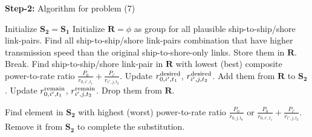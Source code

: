 \documentclass[conference]{IEEEtran}
\begin{document}
 
 \begin{algorithm}[ht]
 \caption{\textbf{Step-2:} Algorithm for problem (7)}
 \begin{algorithmic}[1]
 \STATE Initialize ${{\mathbf{S}}_{\mathbf{2}}}={{\mathbf{S}}_{\mathbf{1}}}$
 \STATE Initialize ${\mathbf{R}} = \phi $ as group for all plausible ship-to-ship/shore link-pairs.
 \STATE Find all ship-to-ship/shore link-pairs combination that have higher transmission speed than the original ship-to-shore-only links. Store them in ${\mathbf{R}}$.
    \STATE Break.
   \ENDIF
   \STATE Find ship-to-ship/shore link-pair in ${\mathbf{R}}$ with lowest (best) composite power-to-rate ratio $ {\frac{{{P_0}}}{{{r_{0,i',{t_1}}}}} + \frac{{{P_{i'}}}}{{{r_{i',j,{t_2}}}}}} $. 
   \STATE Update $r_{0,i',{t_1}}^{\rm{desired}}$, $r_{i',j,{t_2}}^{\rm{desired}}$.
    \STATE Add them from ${\mathbf{R}}$ to ${{\mathbf{S}}_{\mathbf{2}}}$.
    \STATE Update $r_{0,i',{t_1}}^{\rm{remain}}$, $r_{i',j,{t_2}}^{\rm{remain}}$.
   \ELSE
   \STATE Drop them from ${\mathbf{R}}$. 
   \ENDIF
   \ENDWHILE
 \ENDFOR

   \STATE Find element in ${{\mathbf{S}}_{\mathbf{2}}}$ with highest (worst) power-to-rate ratio ${\frac{P_0}{r_{0,j,{t_0}}}}$ or $ {\frac{{{P_0}}}{{{r_{0,i',{t_1}}}}} + \frac{{{P_{i'}}}}{{{r_{i',j,{t_2}}}}}} $. 
   \STATE Remove it from ${{\mathbf{S}}_{\mathbf{2}}}$ to complete the substitution. 
   
 \ENDWHILE
 \end{algorithmic}
 \end{algorithm}
 
\end{document}
